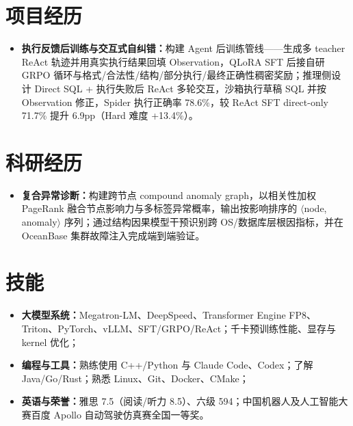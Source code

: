 \documentclass{resume}
\newcommand{\en}[1]{}
\newcommand{\zh}[1]{#1}
\begin{document}
\section{\zh{项目经历}}
\zh{}
\begin{itemize}[parsep=0.25ex]
	\item \zh{\textbf{执行反馈后训练与交互式自纠错：}构建 Agent 后训练管线——生成多 teacher ReAct 轨迹并用真实执行结果回填 Observation，QLoRA SFT 后接自研 GRPO 循环与格式/合法性/结构/部分执行/最终正确性稠密奖励；推理侧设计 Direct SQL + 执行失败后 ReAct 多轮交互，沙箱执行草稿 SQL 并按 Observation 修正，Spider 执行正确率 78.6\%，较 ReAct SFT direct-only 71.7\% 提升 6.9pp（Hard 难度 +13.4\%）。}
\end{itemize}


\section{\zh{科研经历}}
\zh{}
\begin{itemize}[parsep=0.25ex]
	\item \zh{\textbf{复合异常诊断：}构建跨节点 compound anomaly graph，以相关性加权 PageRank 融合节点影响力与多标签异常概率，输出按影响排序的 $\langle$node, anomaly$\rangle$ 序列；通过结构因果模型干预识别跨 OS/数据库层根因指标，并在 OceanBase 集群故障注入完成端到端验证。}
\end{itemize}

\section{\en{Skills}\zh{技能}}
\begin{itemize}[parsep=0.25ex]
	\item \zh{\textbf{大模型系统：}Megatron-LM、DeepSpeed、Transformer Engine FP8、Triton、PyTorch、vLLM、SFT/GRPO/ReAct；千卡预训练性能、显存与 kernel 优化；}
	\item \zh{\textbf{编程与工具：}熟练使用 C++/Python 与 Claude Code、Codex；了解 Java/Go/Rust；熟悉 Linux、Git、Docker、CMake；}
	\item \zh{\textbf{英语与荣誉：}雅思 7.5（阅读/听力 8.5）、六级 594；中国机器人及人工智能大赛百度 Apollo 自动驾驶仿真赛全国一等奖。}
\end{itemize}
\end{document}
